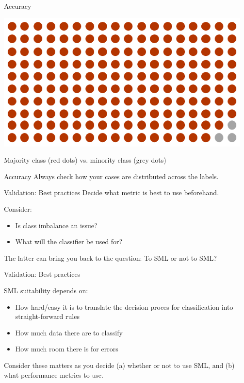 \documentclass[compress]{beamer}
\begin{document}
\begin{frame}{Accuracy}
	
\begin{center}
	\includegraphics[width=\linewidth,height=\textheight,keepaspectratio]{../pictures/imbalance.png} 
\end{center}	

Majority class (red dots) vs. minority class (grey dots) 
\end{frame}

\begin{frame}{Accuracy}
Always check how your cases are distributed across the labels.
\end{frame}


\begin{frame}{Validation: Best practices}
Decide what metric is best to use beforehand.

\begin{alertblock}{Consider:}
	\begin{itemize}
		\item Is class imbalance an issue? 
		\item What will the classifier be used for?
	\end{itemize}
\end{alertblock}

The latter can bring you back to the question: To SML or not to SML?
\end{frame}

\begin{frame}{Validation: Best practices}

\begin{alertblock}{SML suitability depends on:}
\begin{itemize}
	\item How hard/easy it is to translate the decision proces for classification into straight-forward rules
	\item How much data there are to classify
	\item How much room there is for errors 
\end{itemize}
\end{alertblock}
Consider these matters as you decide (a) whether or not to use SML, and (b) what performance metrics to use.
\end{frame}
\end{document}
